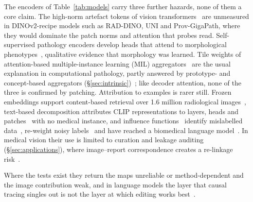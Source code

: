 The encoders of Table~\ref{tab:models} carry three further hazards, none of them a core claim. The
high-norm artefact tokens of vision transformers~\cite{darcet2023vision} are unmeasured in DINOv2-recipe
models such as RAD-DINO, UNI and Prov-GigaPath, where they would dominate the patch norms and attention
that probes read. Self-supervised pathology encoders develop heads that attend to morphological
phenotypes~\cite{chen2022self,chen2024generalpurpose,xu2024wholeslide}, qualitative evidence that
morphology was learned. Tile weights of attention-based multiple-instance learning (MIL)
aggregators~\cite{ilse2018attention,lu2020data} are the usual explanation in computational pathology,
partly answered by prototype- and concept-based aggregators
(\S\ref{sec:intrinsic})~\cite{song2024morphological,huy2025interactive}; like decoder attention, none
of the three is confirmed by patching. Attribution to examples is rarer still. Frozen embeddings support
content-based retrieval over 1.6 million radiological images~\cite{denner2024leveraging}, text-based
decomposition attributes CLIP representations to layers, heads and
patches~\cite{gandelsman2023interpreting,balasubramanian2024decomposing} with no medical instance, and
influence functions~\cite{koh2017influence} identify mislabelled data~\cite{hao2020inaccurate},
re-weight noisy labels~\cite{braun2022influence} and have reached a biomedical language
model~\cite{cao2026scalable}. In medical vision their use is limited to curation and leakage auditing
(\S\ref{sec:applications}), where image--report correspondence creates a re-linkage
risk~\cite{tayebiarasteh2026crossmodal}.

Where the tests exist they return the maps unreliable or method-dependent and the image contribution
weak, and in language models the layer that causal tracing singles out is not the layer at which
editing works best~\cite{hase2023does}.
